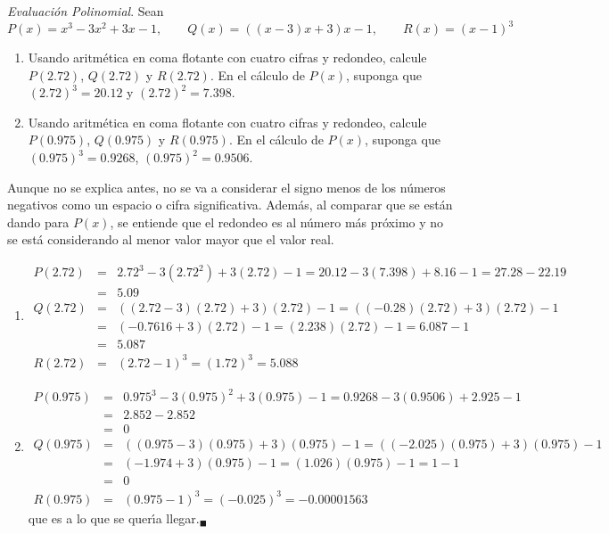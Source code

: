 \begin{enunciado}
 \textit{Evaluaci\'on Polinomial}. Sean
 \begin{equation*}
  P(x) = x^3 - 3x^2 + 3x - 1, \qquad Q(x) = \left((x-3)x+3\right)x-1, \qquad R(x) = (x-1)^3
 \end{equation*}
 \begin{enumerate}
  \item Usando aritm\'etica en coma flotante con cuatro cifras y redondeo, calcule $P(2.72)$, $Q(2.72)$ y $R(2.72)$. En el c\'alculo de $P(x)$, suponga que $(2.72)^3 = 20.12$ y $(2.72)^2 = 7.398$.
  
  \item Usando aritm\'etica en coma flotante con cuatro cifras y redondeo, calcule $P(0.975)$, $Q(0.975)$ y $R(0.975)$. En el c\'alculo de $P(x)$, suponga que $(0.975)^3 = 0.9268$, $(0.975)^2 = 0.9506$.
 \end{enumerate}
\end{enunciado}

\begin{solucion}
 Aunque no se explica antes, no se va a considerar el signo menos de los n\'umeros negativos como un espacio o cifra significativa. Adem\'as, al comparar que se est\'an dando para $P(x)$, se entiende que el redondeo es al n\'umero m\'as pr\'oximo y no se est\'a considerando al menor valor mayor que el valor real.
 \begin{enumerate}
  \item 
  \begin{eqnarray*}
   P(2.72) & = & 2.72^3 - 3\left(2.72^2\right) + 3(2.72) - 1 = 20.12 - 3(7.398) + 8.16 - 1 = 27.28 - 22.19 \\
   & = & 5.09 \\
   Q(2.72) & = & \left((2.72 - 3)(2.72) + 3 \right)(2.72) - 1 = \left( (-0.28)(2.72) + 3 \right)(2.72) - 1 \\
   & = & (-0.7616+3)(2.72) - 1 = (2.238)(2.72)-1 = 6.087-1 \\
   & = & 5.087 \\
   R(2.72) & = & (2.72-1)^3 = (1.72)^3 = 5.088
  \end{eqnarray*}
  
  \item 
  \begin{eqnarray*}
   P(0.975) & = & 0.975^3 - 3(0.975)^2 + 3(0.975) - 1 = 0.9268 - 3(0.9506) + 2.925 - 1 \\
   & = & 2.852 - 2.852 \\
   & = & 0 \\
   Q(0.975) & = & \left( (0.975-3)(0.975)+3 \right)(0.975)-1 = \left( (-2.025)(0.975) +3\right)(0.975) - 1 \\
   & = & (-1.974 + 3)(0.975)-1 = (1.026)(0.975)-1 = 1-1 \\
   & = & 0 \\
   R(0.975) & = & (0.975-1)^3 = (-0.025)^3 = -0.00001563
  \end{eqnarray*}
  que es a lo que se quer\'{\i}a llegar.${}_{\blacksquare}$
 \end{enumerate}
\end{solucion}
